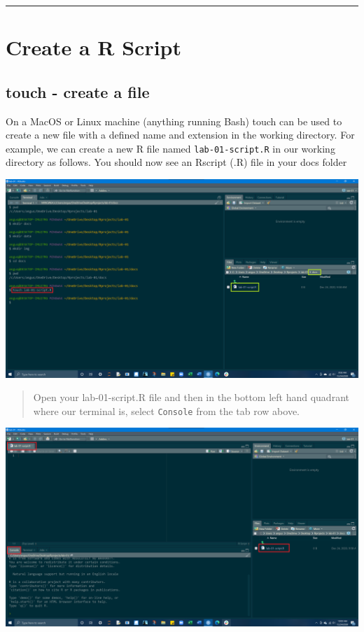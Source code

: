 \documentclass[
]{article}
\begin{document}
\begin{center}\rule{0.5\linewidth}{0.5pt}\end{center}

\hypertarget{create-a-r-script}{%
\section{\texorpdfstring{\textbf{Create a R
Script}}{Create a R Script}}\label{create-a-r-script}}

\hypertarget{touch---create-a-file}{%
\subsection{\texorpdfstring{{touch} - create a
file}{touch - create a file}}\label{touch---create-a-file}}

On a MacOS or Linux machine (anything running Bash) {touch} can be used
to create a new file with a defined name and extension in the working
directory. For example, we can create a new R file named
\texttt{lab-01-script.R} in our working directory as follows. You should
now see an Rscript (.R) file in your docs folder

\includegraphics{img/touch-rscript-docs.png}

\begin{quote}
Open your lab-01-script.R file and then in the bottom left hand quadrant
where our terminal is, select \texttt{Console} from the tab row above.
\end{quote}

\includegraphics{img/open-rscript-console.png}
\end{document}
